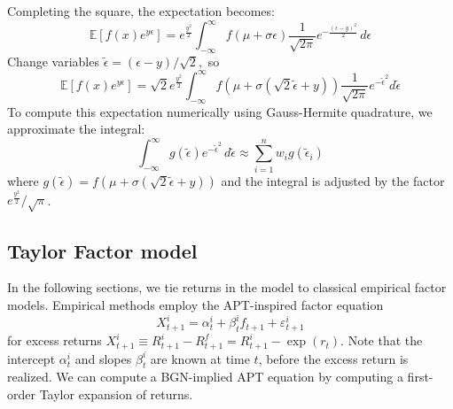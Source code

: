 Completing the square, the expectation becomes:
\begin{equation*}
\mathbb{E}[f(x) e^{y \epsilon}] = e^{\frac{y^2}{2}} \int_{-\infty}^{\infty} f(\mu + \sigma \epsilon) \frac{1}{\sqrt{2\pi}} e^{-\frac{(\epsilon - y)^2}{2}} \, d\epsilon
\end{equation*}
Change variables $\tilde{\epsilon} = (\epsilon - y)/\sqrt{2},$
so
\begin{equation*}
\mathbb{E}[f(x) e^{y \epsilon}] = \sqrt{2} e^{\frac{y^2}{2}} \int_{-\infty}^{\infty} f\left(\mu + \sigma \left(\sqrt 2 \tilde{\epsilon} + y\right)\right) \frac{1}{\sqrt{2\pi}} e^{-\tilde{\epsilon}^2}  d\tilde{\epsilon}
\end{equation*}
To compute this expectation numerically using Gauss-Hermite quadrature, we approximate the integral:
\begin{equation*}
\int_{-\infty}^{\infty} g(\tilde{\epsilon}) e^{-\tilde{\epsilon}^2} \, d\tilde{\epsilon} \approx \sum_{i=1}^{n} w_i g(\tilde{\epsilon}_i)
\end{equation*}
where $g(\tilde{\epsilon}) = f(\mu + \sigma (\sqrt{2} \tilde{\epsilon} + y))$ and the integral is adjusted by the factor $e^{\frac{y^2}{2}}/\sqrt{\pi}$.

\subsection{Taylor Factor model}
In the following sections, we tie returns in the model to classical empirical factor models. Empirical methods employ the APT-inspired factor equation
\begin{equation} X_{t+1}^i = \alpha_{t}^i + \beta_t^if_{t+1} + \varepsilon_{t+1}^i\label{eqn:apt like eqn}
\end{equation}
for excess returns $X_{t+1}^i \equiv R_{t+1}^i - R_{t+1}^f = R_{t+1}^i - \exp(r_t)$. Note that the intercept $\alpha_t^i$ and slopes $\beta_t^i$ are known at time $t$, before the excess return is realized. We can compute a BGN-implied APT equation by computing a first-order Taylor expansion of returns.

